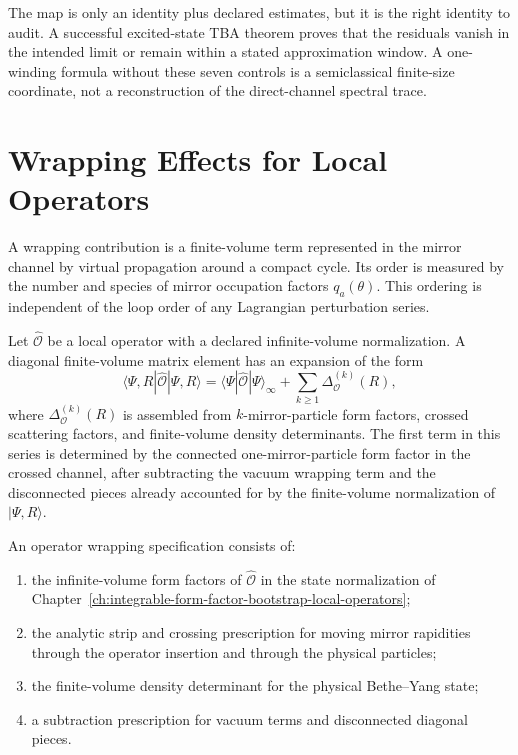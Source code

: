 The map is only an identity plus declared estimates, but it is the right
identity to audit.  A successful excited-state TBA theorem proves that the
residuals vanish in the intended limit or remain within a stated approximation
window.  A one-winding formula without these seven controls is a semiclassical
finite-size coordinate, not a reconstruction of the direct-channel spectral
trace.

\section{Wrapping Effects for Local Operators}

A wrapping contribution is a finite-volume term represented in the mirror
channel by virtual propagation around a compact cycle.  Its order is measured
by the number and species of mirror occupation factors \(q_a(\theta)\).  This
ordering is independent of the loop order of any Lagrangian perturbation
series.

Let \(\widehat{\mathcal O}\) be a local operator with a declared infinite-volume
normalization.  A diagonal finite-volume matrix element has an expansion of
the form
\[
  \langle \Psi,R|\widehat{\mathcal O}|\Psi,R\rangle
  =
  \langle \Psi|\widehat{\mathcal O}|\Psi\rangle_{\infty}
  +
  \sum_{k\ge1}\Delta_{\mathcal O}^{(k)}(R),
\]
where \(\Delta_{\mathcal O}^{(k)}(R)\) is assembled from \(k\)-mirror-particle
form factors, crossed scattering factors, and finite-volume density
determinants.  The first term in this series is determined by the connected
one-mirror-particle form factor in the crossed channel, after subtracting
the vacuum wrapping term and the disconnected pieces already accounted for by
the finite-volume normalization of \(|\Psi,R\rangle\).

\begin{definition}
\label{def:operator-wrapping-datum}
An operator wrapping specification consists of:
\begin{enumerate}
\item the infinite-volume form factors of \(\widehat{\mathcal O}\) in the
state normalization of Chapter~\ref{ch:integrable-form-factor-bootstrap-local-operators};
\item the analytic strip and crossing prescription for moving mirror
rapidities through the operator insertion and through the physical particles;
\item the finite-volume density determinant for the physical Bethe--Yang
state;
\item a subtraction prescription for vacuum terms and disconnected diagonal
pieces.
\end{enumerate}
\end{definition}

